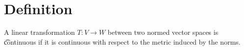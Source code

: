
\section*{Definition}

A linear transformation $T: V \to W$ between two normed vector spaces is \t{continuous} if it is continuous with respect to the metric induced by the norms.


\blankpage
